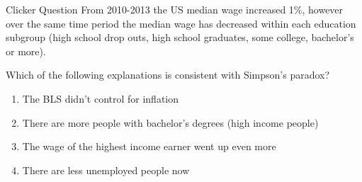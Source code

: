\documentclass{beamer}
\begin{document}
\begin{frame}{Clicker Question}
	From 2010-2013 the US median wage increased 1\%, however over the same time period the median wage has decreased within each education subgroup (high school drop outs, high school graduates, some college, bachelor's or more).
	
	Which of the following explanations is consistent with Simpson's paradox?
	\begin{enumerate}[label=(\alph*)]
		\item The BLS didn't control for inflation
		\item There are more people with bachelor's degrees (high income people)
		\item The wage of the highest income earner went up even more
		\item There are less unemployed people now
	\end{enumerate}
\end{frame}
\end{document}
